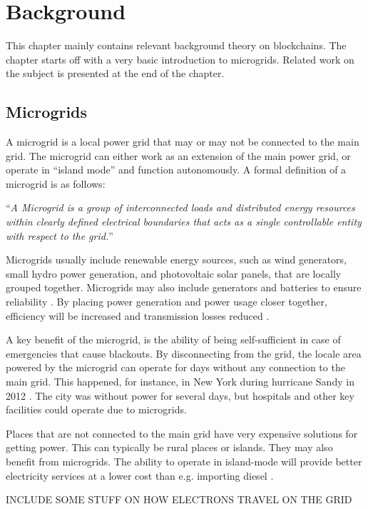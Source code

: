\chapter{Background}
This chapter mainly contains relevant background theory on blockchains. The chapter starts off with a very basic introduction to microgrids. Related work on the subject is presented at the end of the chapter. 

\section{Microgrids}
A microgrid is a local power grid that may or may not be connected to the main grid. The microgrid can either work as an extension of the main power grid, or operate in \enquote{island mode} and function autonomously. A formal definition of a microgrid is as follows: 

\enquote{\textit{A Microgrid is a group of interconnected loads and distributed energy resources within clearly defined electrical boundaries that acts as a single controllable entity with respect to the grid.}} \cite{micro_securicon}

Microgrids usually include renewable energy sources, such as wind generators, small hydro power generation, and photovoltaic solar panels, that are locally grouped together. Microgrids may also include generators and batteries to ensure reliability \cite{general_microgrid}. By placing power generation and power usage closer together, efficiency will be increased and transmission losses reduced \cite{Microgrid_konashevych}. 

A key benefit of the microgrid, is the ability of being self-sufficient in case of emergencies that cause blackouts. By disconnecting from the grid, the locale area powered by the microgrid can operate for days without any connection to the main grid. This happened, for instance, in New York during hurricane Sandy in 2012 \cite{sandy}. The city was without power for several days, but hospitals and other key facilities could operate due to microgrids. 

Places that are not connected to the main grid have very expensive solutions for getting power. This can typically be rural places or islands. They may also benefit from microgrids. The ability to operate in island-mode will provide better electricity services at a lower cost than e.g. importing diesel \cite{abb}.

INCLUDE SOME STUFF ON HOW ELECTRONS TRAVEL ON THE GRID 

